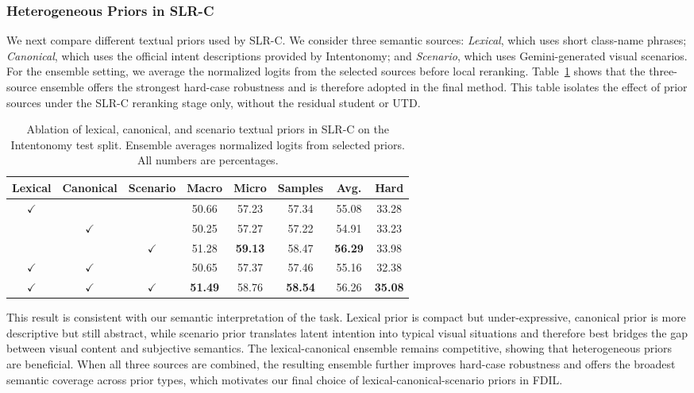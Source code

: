 \subsubsection{Heterogeneous Priors in SLR-C}

We next compare different textual priors used by SLR-C. We consider three semantic sources: \textit{Lexical}, which uses short class-name phrases; \textit{Canonical}, which uses the official intent descriptions provided by Intentonomy; and \textit{Scenario}, which uses Gemini-generated visual scenarios. For the ensemble setting, we average the normalized logits from the selected sources before local reranking. Table~\ref{tab:prior_ablation} shows that the three-source ensemble offers the strongest hard-case robustness and is therefore adopted in the final method. This table isolates the effect of prior sources under the SLR-C reranking stage only, without the residual student or UTD. 
\begin{table}[t]
\centering
\caption{Ablation of lexical, canonical, and scenario textual priors in SLR-C on the Intentonomy test split. Ensemble averages normalized logits from selected priors. All numbers are percentages.}
\label{tab:prior_ablation}
\begin{tabular}{cccccccc}
\hline
Lexical & Canonical & Scenario & Macro & Micro & Samples & Avg. & Hard \\
\hline
$\checkmark$ &  &  & 50.66 & 57.23 & 57.34 & 55.08 & 33.28 \\
 & $\checkmark$ &  & 50.25 & 57.27 & 57.22 & 54.91 & 33.23 \\
 &  & $\checkmark$ & 51.28 & \textbf{59.13} & 58.47 & \textbf{56.29} & 33.98 \\
$\checkmark$ & $\checkmark$ &  & 50.65 & 57.37 & 57.46 & 55.16 & 32.38 \\
$\checkmark$ & $\checkmark$ & $\checkmark$ & \textbf{51.49} & 58.76 & \textbf{58.54} & 56.26 & \textbf{35.08} \\
\hline
\end{tabular}
\end{table}

This result is consistent with our semantic interpretation of the task. Lexical prior is compact but under-expressive, canonical prior is more descriptive but still abstract, while scenario prior translates latent intention into typical visual situations and therefore best bridges the gap between visual content and subjective semantics. The lexical-canonical ensemble remains competitive, showing that heterogeneous priors are beneficial. When all three sources are combined, the resulting ensemble further improves hard-case robustness and offers the broadest semantic coverage across prior types, which motivates our final choice of lexical-canonical-scenario priors in FDIL.

